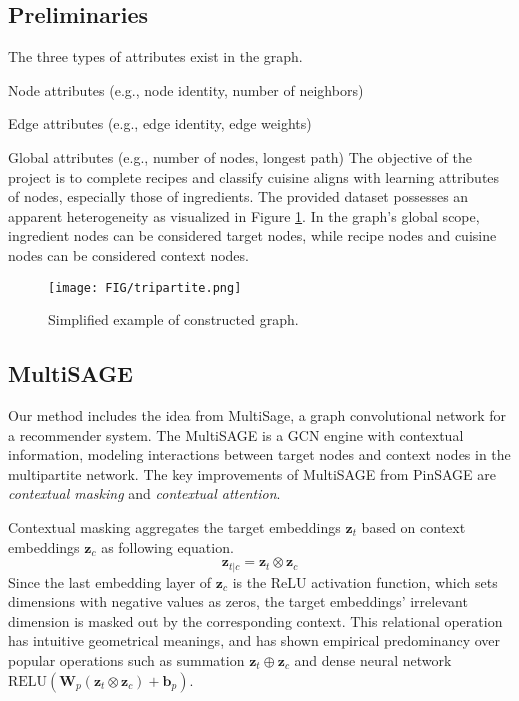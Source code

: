 \subsection{Preliminaries}

The three types of attributes exist in the graph.
\bit
    \item Node attributes (e.g., node identity, number of neighbors)
    \item Edge attributes (e.g., edge identity, edge weights)
    \item Global attributes (e.g., number of nodes, longest path)
\eit
The objective of the project is to complete recipes and classify cuisine aligns with learning attributes of nodes, especially those of ingredients.
The provided dataset possesses an apparent heterogeneity as visualized in Figure \ref{fig:tripartite}.
In the graph's global scope, ingredient nodes can be considered target nodes, while recipe nodes and cuisine nodes can be considered context nodes.

\begin{figure}[btp!]
    \centering
    \texttt{[image: FIG/tripartite.png]}
    \caption{\label{fig:tripartite}Simplified example of constructed graph.}
\end{figure}

\subsection{MultiSAGE}

Our method includes the idea from MultiSage, a graph convolutional network for a recommender system.
The MultiSAGE\cite{10.1145/3394486.3403293} is a GCN engine with contextual information, modeling interactions between target nodes and context nodes in the multipartite network.
The key improvements of MultiSAGE from PinSAGE are \emph{contextual masking} and \emph{contextual attention}.

Contextual masking aggregates the target embeddings $\mathbf{z}_t$ based on context embeddings $\mathbf{z}_c$ as following equation.
\begin{equation}
    \mathbf{z}_{t|c} = \mathbf{z}_t \otimes \mathbf{z}_c
\end{equation}
Since the last embedding layer of $\mathbf{z}_c$ is the ReLU activation function, which sets dimensions with negative values as zeros, the target embeddings' irrelevant dimension is masked out by the corresponding context. This relational operation has intuitive geometrical meanings, and has shown empirical predominancy over popular operations such as summation $\mathbf{z}_t \oplus \mathbf{z}_c$ and dense neural network $\text{RELU}(\mathbf{W}_p(\mathbf{z}_t \otimes \mathbf{z}_c) + \mathbf{b}_p)$.

